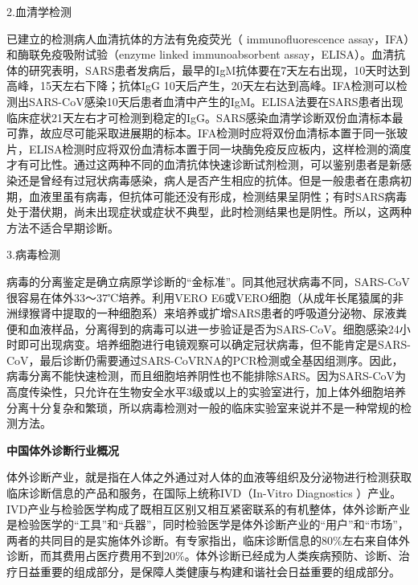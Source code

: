 2.血清学检测

已建立的检测病人血清抗体的方法有免疫荧光（ immunofluorescence
assay，IFA）和酶联免疫吸附试验（enzyme linked immunoabsorbent
assay，ELISA）。血清抗体的研究表明，SARS患者发病后，最早的IgM抗体要在7天左右出现，10天时达到高峰，15天左右下降；抗体IgG
10天后产生，20天左右达到高峰。IFA检测可以检测出SARS-CoV感染10天后患者血清中产生的IgM。ELISA法要在SARS患者出现临床症状21天左右才可检测到稳定的IgG。SARS感染血清学诊断双份血清标本最可靠，故应尽可能采取进展期的标本。IFA检测时应将双份血清标本置于同一张玻片，ELISA检测时应将双份血清标本置于同一块酶免疫反应板内，这样检测的滴度才有可比性。通过这两种不同的血清抗体快速诊断试剂检测，可以鉴别患者是新感染还是曾经有过冠状病毒感染，病人是否产生相应的抗体。但是一般患者在患病初期，血液里虽有病毒，但抗体可能还没有形成，检测结果呈阴性；有时SARS病毒处于潜伏期，尚未出现症状或症状不典型，此时检测结果也是阴性。所以，这两种方法不适合早期诊断。

3.病毒检测

病毒的分离鉴定是确立病原学诊断的“金标准”。同其他冠状病毒不同，SARS-CoV很容易在体外33～37℃培养。利用VERO
E6或VERO细胞（从成年长尾猿属的非洲绿猴肾中提取的一种细胞系）来培养或扩增SARS患者的呼吸道分泌物、尿液粪便和血液样品，分离得到的病毒可以进一步验证是否为SARS-CoV。细胞感染24小时即可出现病变。培养细胞进行电镜观察可以确定冠状病毒，但不能肯定是SARS-CoV，最后诊断仍需要通过SARS-CoVRNA的PCR检测或全基因组测序。因此，病毒分离不能快速检测，而且细胞培养阴性也不能排除SARS。因为SARS-CoV为高度传染性，只允许在生物安全水平3级或以上的实验室进行，加上体外细胞培养分离十分复杂和繁琐，所以病毒检测对一般的临床实验室来说并不是一种常规的检测方法。

\begin{center}
 \textbf{\Large 中国体外诊断行业概况}
 \end{center}

体外诊断产业，就是指在人体之外通过对人体的血液等组织及分泌物进行检测获取临床诊断信息的产品和服务，在国际上统称IVD（In-Vitro
Diagnostics
）产业。IVD产业与检验医学构成了既相互区别又相互紧密联系的有机整体，体外诊断产业是检验医学的“工具”和“兵器”，同时检验医学是体外诊断产业的“用户”和“市场”，两者的共同目的是实施体外诊断。有专家指出，临床诊断信息的80\%左右来自体外诊断，而其费用占医疗费用不到20\%。体外诊断已经成为人类疾病预防、诊断、治疗日益重要的组成部分，是保障人类健康与构建和谐社会日益重要的组成部分。

